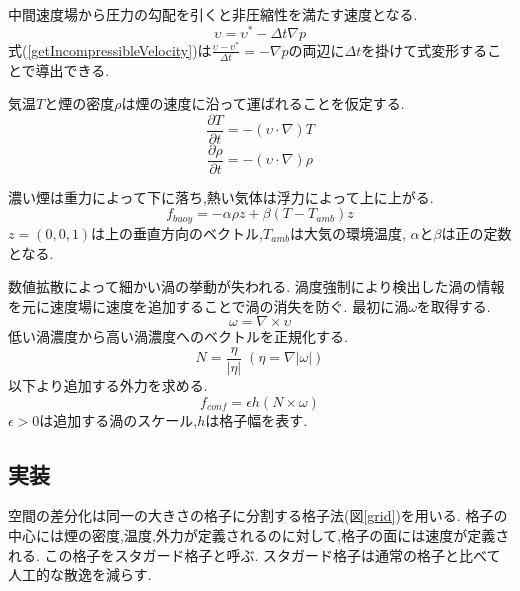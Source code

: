 中間速度場から圧力の勾配を引くと非圧縮性を満たす速度となる.
\begin{equation}
\label{getIncompressibleVelocity}
\upsilon = \upsilon^* - \Delta t \nabla p
\end{equation}
式(\ref{getIncompressibleVelocity})は$\frac{\upsilon - \upsilon^* }{\Delta t} = - \nabla p$の両辺に$\Delta t$を掛けて式変形することで導出できる.

気温$T$と煙の密度$\rho$は煙の速度に沿って運ばれることを仮定する.
\begin{equation}
\label{temperature}
\frac{\partial T}{\partial t} = - ( \upsilon \cdot \nabla)T
\end{equation}
\begin{equation}
\label{temperature}
\frac{\partial \rho}{\partial t} = - ( \upsilon \cdot \nabla)\rho
\end{equation}

濃い煙は重力によって下に落ち,熱い気体は浮力によって上に上がる.
\begin{equation}
\label{buoyancy}
f_{buoy}=-\alpha\rho z + \beta(T-T_{amb}) z
\end{equation} 
$z=(0,0,1)$は上の垂直方向のベクトル,$T_{amb}$は大気の環境温度,
$\alpha$と$\beta$は正の定数となる.

数値拡散によって細かい渦の挙動が失われる.
渦度強制により検出した渦の情報を元に速度場に速度を追加することで渦の消失を防ぐ.
最初に渦$\omega$を取得する.
\begin{equation}
\label{volticity}
\omega=\nabla \times \upsilon
\end{equation}
低い渦濃度から高い渦濃度へのベクトルを正規化する.
\begin{equation}
\label{normalizeVelocityLocation}
N=\frac{\eta}{|\eta|}\;(\eta=\nabla|\omega|)
\end{equation}
以下より追加する外力を求める.
\begin{equation}
\label{confinementForce}
f_{conf}=\epsilon h (N \times \omega)
\end{equation}
$\epsilon > 0$は追加する渦のスケール,$h$は格子幅を表す.
\subsection{実装}

空間の差分化は同一の大きさの格子に分割する格子法(図\ref{grid})を用いる.
格子の中心には煙の密度,温度,外力が定義されるのに対して,格子の面には速度が定義される.
この格子をスタガード格子と呼ぶ.
スタガード格子は通常の格子と比べて人工的な散逸を減らす.

